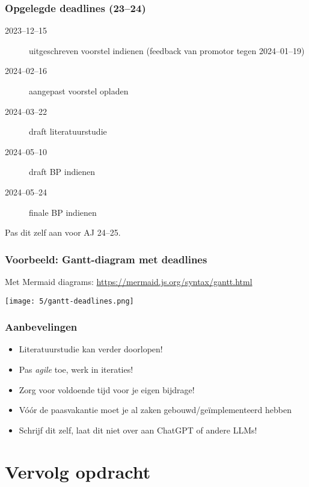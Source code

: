 \documentclass[aspectratio=169]{beamer}
\begin{document}
\begin{frame}
  \frametitle{Opgelegde deadlines (23--24)}

  \begin{description}
    \item[2023--12--15] uitgeschreven voorstel indienen (feedback van promotor tegen 2024--01--19)
    \item[2024--02--16] aangepast voorstel opladen
    \item[2024--03--22] draft literatuurstudie
    \item[2024--05--10] draft BP indienen
    \item[2024--05--24] finale BP indienen
  \end{description}

  \medskip

  Pas dit zelf aan voor AJ 24--25.

\end{frame}

\begin{frame}[plain]
  \frametitle{Voorbeeld: Gantt-diagram met deadlines}

  Met Mermaid diagrams: \url{https://mermaid.js.org/syntax/gantt.html}

  \centering
  \texttt{[image: 5/gantt-deadlines.png]}
\end{frame}

\begin{frame}
  \frametitle{Aanbevelingen}

  \begin{itemize}
    \item Literatuurstudie kan verder doorlopen!
    \item Pas \textit{agile} toe, werk in iteraties!
    \item Zorg voor voldoende tijd voor je eigen bijdrage!
    \item Vóór de paasvakantie moet je al zaken gebouwd/geïmplementeerd hebben
    \item Schrijf dit zelf, laat dit niet over aan ChatGPT of andere LLMs!
  \end{itemize}

\end{frame}

\section{Vervolg opdracht}
\end{document}
